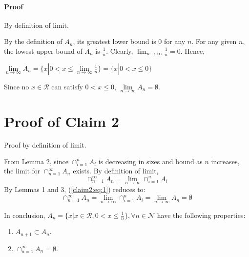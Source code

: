 \documentclass[14pt]{extarticle}
\begin{document}
	\paragraph{Proof} By definition of limit.
	\par\bigskip
	By the definition of $A_n$, its greatest lower bound is 0 for any $n$.  For any given $n$, the lowest upper bound of $A_n$ is $\frac{1}{n}$.  Clearly, $\lim_{n \to \infty} \frac{1}{n} = 0$.  Hence,
	\begin{center}
		$\lim\limits_{n \to \infty} A_n = \{x| 0 < x \le \lim\limits_{n \to \infty} \frac{1}{n}\} = \{x| 0 < x \le 0\}$	
	\end{center} 
	Since no $x \in \mathcal{R}$ can satisfy $0 < x \le 0$, $\lim\limits_{n \to \infty} A_n = \emptyset$.
	\section{Proof of Claim 2}
	Proof by definition of limit.
	\par\bigskip
	From Lemma 2, since $\cap_{i=1}^n A_i$ is decreasing in sizes and bound as $n$ increases, the limit for $\cap_{n=1}^\infty A_n$ exists. By definition of limit,
	\begin{equation}\label{claim2:eq:1}
		\cap_{n=1}^\infty A_n = \lim_{n \to \infty} \cap_{i=1}^n A_i
	\end{equation}
	By Lemmas 1 and 3, (\ref{claim2:eq:1}) reduces to:
	\begin{equation}\label{claim2:eq:2}
	\cap_{n=1}^\infty A_n = \lim_{n \to \infty} \cap_{i=1}^n A_i = \lim_{n \to \infty} A_n = \emptyset
	\end{equation} 
	\par\bigskip
	In conclusion, $A_n = \{x|x \in \mathcal{R}, 0 < x \le \frac{1}{n}\}, \forall n \in \mathcal{N}$ have the following properties:
	\begin{enumerate}
		\item $A_{n+1} \subset A_n$.
		\item $\cap_{n=1}^\infty A_n=\emptyset$.
	\end{enumerate}
\end{document}
